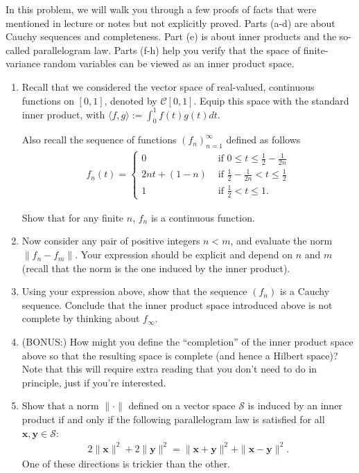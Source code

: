 \documentclass[11pt,twoside]{article}
\begin{document}
In this problem, we will walk you through a few proofs of facts that were mentioned in lecture or notes but not explicitly proved. Parts (a-d) are about Cauchy sequences and completeness. Part (e) is about inner products and the so-called parallelogram law. Parts (f-h) help you verify that the space of finite-variance random variables can be viewed as an inner product space. 
\begin{enumerate}[label=(\alph*)]
\item Recall that we considered the vector space of real-valued, continuous functions on $[0, 1]$, denoted by $\mathcal{C}[0, 1]$. Equip this space with the standard inner product, with $\langle f, g \rangle := \int_{0}^1 f(t) g(t) dt$.

Also recall the sequence of functions $(f_n)_{n = 1}^{\infty}$ defined as follows
\begin{align*}
f_n(t) = 
\begin{cases}
0 &\text{ if } 0 \leq t \leq \frac{1}{2} - \frac{1}{2n} \\
2nt + (1 - n)  &\text{ if } \frac{1}{2} - \frac{1}{2n} < t \leq \frac{1}{2} \\
1 &\text{ if } \frac{1}{2} < t \leq 1.
\end{cases}
\end{align*}

Show that for any finite $n$, $f_n$ is a continuous function.

\item Now consider any pair of positive integers $n < m$, and evaluate the norm $\| f_n - f_m \|$. Your expression should be explicit and depend on $n$ and $m$ (recall that the norm is the one induced by the inner product).

\item Using your expression above, show that the sequence $(f_n)$ is a Cauchy sequence. Conclude that the inner product space introduced above is not complete by thinking about $f_\infty$.

\item (BONUS:) How might you define the ``completion'' of the inner product space above so that the resulting space is complete (and hence a Hilbert space)? Note that this will require extra reading that you don't need to do in principle, just if you're interested.

\item Show that a norm $\| \cdot \|$ defined on a vector space $\mathcal{S}$ is induced by an inner product if and only if the following parallelogram law is satisfied for all $\mathbf{x}, \mathbf{y} \in \mathcal{S}$:
\begin{align*}
2 \| \mathbf{x} \|^2 +  2 \| \mathbf{y} \|^2 = \| \mathbf{x + y} \|^2 + \| \mathbf{x - y} \|^2.
\end{align*}
One of these directions is trickier than the other.


\end{enumerate}
\end{document}
